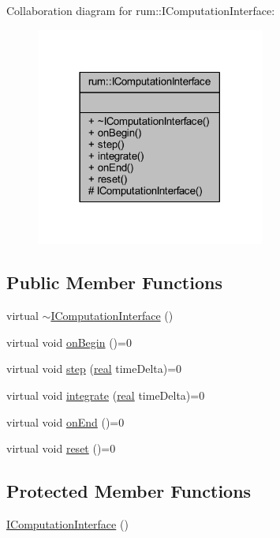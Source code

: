 Collaboration diagram for rum\+:\+:I\+Computation\+Interface\+:\nopagebreak
\begin{figure}[H]
\begin{center}
\leavevmode
\includegraphics[width=213pt]{classrum_1_1_i_computation_interface__coll__graph}
\end{center}
\end{figure}
\subsection*{Public Member Functions}
\begin{DoxyCompactItemize}
\item 
virtual \mbox{\hyperlink{classrum_1_1_i_computation_interface_a387db72654c3e9cc8cd6ebcdfd3380ef}{$\sim$\+I\+Computation\+Interface}} ()
\item 
virtual void \mbox{\hyperlink{classrum_1_1_i_computation_interface_a17f23c01b55d0ad7e0a13cbfd35a592c}{on\+Begin}} ()=0
\item 
virtual void \mbox{\hyperlink{classrum_1_1_i_computation_interface_aa033d368ac4057a52077d6724b94d334}{step}} (\mbox{\hyperlink{namespacerum_a7e8cca23573d5eaead0f138cbaa4862c}{real}} time\+Delta)=0
\item 
virtual void \mbox{\hyperlink{classrum_1_1_i_computation_interface_aac705477dabefaf59986974c6c51ba31}{integrate}} (\mbox{\hyperlink{namespacerum_a7e8cca23573d5eaead0f138cbaa4862c}{real}} time\+Delta)=0
\item 
virtual void \mbox{\hyperlink{classrum_1_1_i_computation_interface_afaec27e8a634cd95cfc3aaa3e4664178}{on\+End}} ()=0
\item 
virtual void \mbox{\hyperlink{classrum_1_1_i_computation_interface_a9cff2ff492abd2a4f014aa4f25184c8b}{reset}} ()=0
\end{DoxyCompactItemize}
\subsection*{Protected Member Functions}
\begin{DoxyCompactItemize}
\item 
\mbox{\hyperlink{classrum_1_1_i_computation_interface_a6b8e39351f03c762f9ada7aca0244b7b}{I\+Computation\+Interface}} ()
\end{DoxyCompactItemize}



